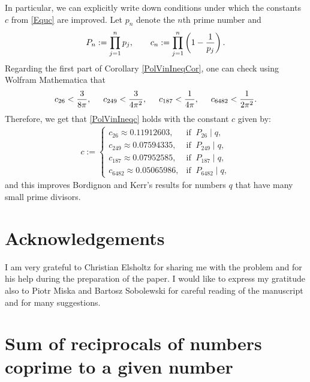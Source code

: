 \documentclass[a4paper]{amsart}
\newcommand{\1}{\mathbbm{1}}
\begin{document}
In particular, we can explicitly write down conditions under which the constants $c$ from \eqref{Equc} are improved. Let $p_{n}$ denote the $n$th prime number and
\begin{align*}
P_{n}:=\prod_{j=1}^{n} p_{j}, \hspace{0.7cm} c_{n}:=\prod_{j=1}^{n}\left(1-\frac{1}{p_{j}}\right).
\end{align*}
Regarding the first part of Corollary \ref{PolVinIneqCor}, one can check using Wolfram Mathematica \cite{Wol} that
\begin{align*}
c_{26} < \frac{3}{8\pi}, \hspace{0.5cm} c_{249}<\frac{3}{4\pi^{2}}, \hspace{0.5cm} c_{187}<\frac{1}{4\pi}, \hspace{0.5cm} c_{6482}<\frac{1}{2\pi^{2}}.
\end{align*}
Therefore, we get that \eqref{PolVinIneqc} holds with the constant $c$ given by:
\begin{align*}
c := \left\{\begin{array}{ll}
c_{26}\approx 0.11912603, & \textrm{if }\ P_{26}\mid q, \\
c_{249}\approx 0.07594335, & \textrm{if }\ P_{249}\mid q, \\
c_{187}\approx 0.07952585, & \textrm{if }\ P_{187}\mid q, \\
c_{6482}\approx 0.05065986, & \textrm{if }\ P_{6482}\mid q,
\end{array}\right.
\end{align*}
and this improves Bordignon and Kerr's results \cite{B,BK} for numbers $q$ that have many small prime divisors.



\section*{Acknowledgements}
I am very grateful to Christian Elsholtz for sharing me with the problem and for his help during the preparation of the paper. I would like to express my gratitude also to Piotr Miska and Bartosz Sobolewski for careful reading of the manuscript and for many suggestions.





\section{Sum of reciprocals of numbers coprime to a given number}
\end{document}
